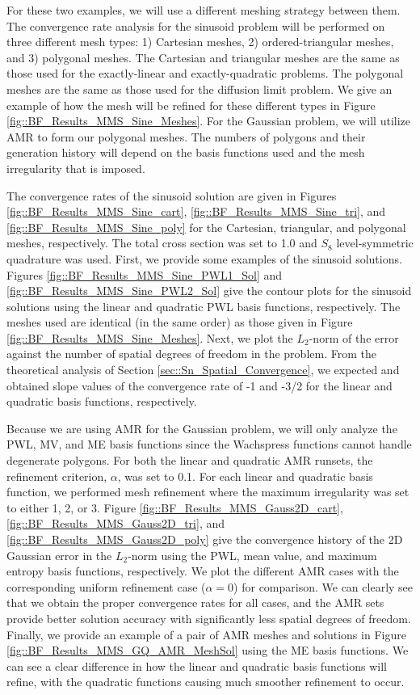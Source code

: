 For these two examples, we will use a different meshing strategy between them. The convergence rate analysis for the sinusoid problem will be performed on three different mesh types: 1) Cartesian meshes, 2) ordered-triangular meshes, and 3) polygonal meshes. The Cartesian and triangular meshes are the same as those used for the exactly-linear and exactly-quadratic problems. The polygonal meshes are the same as those used for the diffusion limit problem. We give an example of how the mesh will be refined for these different types in Figure \ref{fig::BF_Results_MMS_Sine_Meshes}. For the Gaussian problem, we will utilize AMR to form our polygonal meshes. The numbers of polygons and their generation history will depend on the basis functions used and the mesh irregularity that is imposed.

The convergence rates of the sinusoid solution are given in Figures \ref{fig::BF_Results_MMS_Sine_cart}, \ref{fig::BF_Results_MMS_Sine_tri}, and \ref{fig::BF_Results_MMS_Sine_poly} for the Cartesian, triangular, and polygonal meshes, respectively. The total cross section was set to 1.0 and $S_8$ level-symmetric quadrature was used. First, we provide some examples of the sinusoid solutions. Figures \ref{fig::BF_Results_MMS_Sine_PWL1_Sol} and \ref{fig::BF_Results_MMS_Sine_PWL2_Sol} give the contour plots for the sinusoid solutions using the linear and quadratic PWL basis functions, respectively. The meshes used are identical (in the same order) as those given in Figure \ref{fig::BF_Results_MMS_Sine_Meshes}. Next, we plot the $L_2$-norm of the error against the number of spatial degrees of freedom in the problem. From the theoretical analysis of Section \ref{sec::Sn_Spatial_Convergence}, we expected and obtained slope values of the convergence rate of -1 and -3/2 for the linear and quadratic basis functions, respectively. 

Because we are using AMR for the Gaussian problem, we will only analyze the PWL, MV, and ME basis functions since the Wachspress functions cannot handle degenerate polygons. For both the linear and quadratic AMR runsets, the refinement criterion, $\alpha$, was set to 0.1. For each linear and quadratic basis function, we performed mesh refinement where the maximum irregularity was set to either 1, 2, or 3. Figure \ref{fig::BF_Results_MMS_Gauss2D_cart}, \ref{fig::BF_Results_MMS_Gauss2D_tri}, and \ref{fig::BF_Results_MMS_Gauss2D_poly} give the convergence history of the 2D Gaussian error in the $L_2$-norm using the PWL, mean value, and maximum entropy basis functions, respectively. We plot the different AMR cases with the corresponding uniform refinement case ($\alpha=0$) for comparison. We can clearly see that we obtain the proper convergence rates for all cases, and the AMR sets provide better solution accuracy with significantly less spatial degrees of freedom. Finally, we provide an example of a pair of AMR meshes and solutions in Figure \ref{fig::BF_Results_MMS_GQ_AMR_MeshSol} using the ME basis functions. We can see a clear difference in how the linear and quadratic basis functions will refine, with the quadratic functions causing much smoother refinement to occur.

